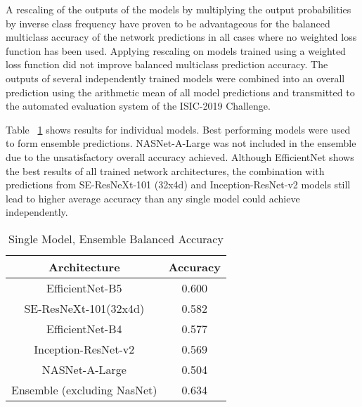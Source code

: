\documentclass[journal]{IEEEtran}
\begin{document}
A rescaling of the outputs of the models by multiplying the output probabilities by inverse class frequency have proven to be advantageous for the  balanced multiclass accuracy of the network predictions in all cases where no weighted loss function has been used. Applying rescaling on models trained using a weighted loss function did not improve balanced multiclass prediction accuracy. The outputs of several independently trained models were combined into an overall prediction using the arithmetic mean of all model predictions and transmitted to the automated evaluation system of the ISIC-2019 Challenge.

Table ~\ref{table_metrics_models} shows results for individual models. Best performing models were used to form ensemble predictions. NASNet-A-Large was not included in the ensemble due to the unsatisfactory overall accuracy achieved. Although EfficientNet  shows the best results of all trained network architectures, the combination with predictions from SE-ResNeXt-101 (32x4d) and Inception-ResNet-v2 models still lead to higher average accuracy than any single model could achieve independently.

\begin{table}
\caption{Single Model, Ensemble Balanced Accuracy}
\label{table_metrics_models}
\centering
\begin{tabular}{c | c}
Architecture & Accuracy \\
\hline
EfficientNet-B5 & 0.600 \\
SE-ResNeXt-101(32x4d) &	0.582 \\
EfficientNet-B4	& 0.577\\
Inception-ResNet-v2	& 0.569\\
NASNet-A-Large & 0.504\\
\hline
Ensemble (excluding NasNet) & 0.634\\
\end{tabular}
\end{table}
\end{document}
